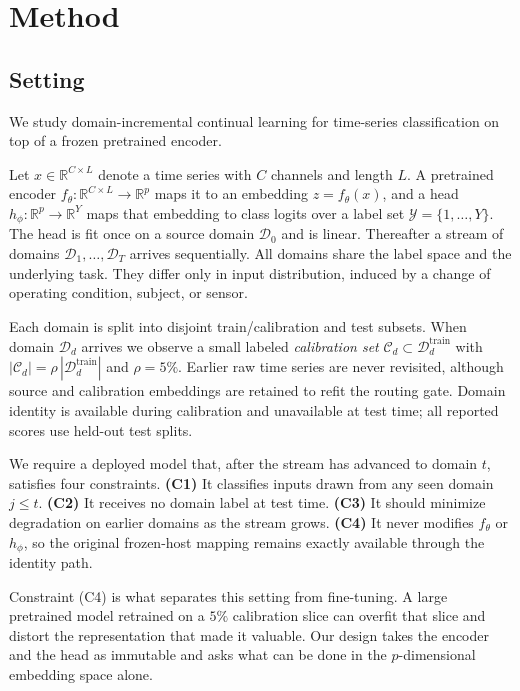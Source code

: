 \documentclass[letterpaper]{article} %
\begin{document}
\section{Method}
\label{sec:method}

\subsection{Setting}
\label{sec:setting}

We study domain-incremental continual learning for time-series classification
on top of a frozen pretrained encoder.

Let $x\in\mathbb{R}^{C\times L}$ denote a time series with $C$ channels and
length $L$. A pretrained encoder $f_\theta:\mathbb{R}^{C\times L}\to\mathbb{R}^{p}$
maps it to an embedding $z=f_\theta(x)$, and a head
$h_\phi:\mathbb{R}^{p}\to\mathbb{R}^{Y}$ maps that embedding to class logits over a
label set $\mathcal{Y}=\{1,\dots,Y\}$. The head is fit once on a source domain
$\mathcal{D}_0$ and is linear. Thereafter a stream of domains
$\mathcal{D}_1,\dots,\mathcal{D}_T$ arrives sequentially. All domains share the
label space and the underlying task. They differ only in input distribution,
induced by a change of operating condition, subject, or sensor.

Each domain is split into disjoint train/calibration and test subsets. When
domain $\mathcal{D}_d$ arrives we observe a small labeled \emph{calibration
set} $\mathcal{C}_d\subset\mathcal{D}^{\mathrm{train}}_d$ with
$|\mathcal{C}_d|=\rho\,|\mathcal{D}^{\mathrm{train}}_d|$ and $\rho=5\%$.
Earlier raw time series are never revisited, although source and calibration
embeddings are retained to refit the routing gate. Domain identity is available
during calibration and unavailable at test time; all reported scores use
held-out test splits.

We require a deployed model that, after the stream has advanced to domain $t$,
satisfies four constraints.
\textbf{(C1)} It classifies inputs drawn from any seen domain $j\le t$.
\textbf{(C2)} It receives no domain label at test time.
\textbf{(C3)} It should minimize degradation on earlier domains as the stream grows.
\textbf{(C4)} It never modifies $f_\theta$ or $h_\phi$, so the original
frozen-host mapping remains exactly available through the identity path.

Constraint (C4) is what separates this setting from fine-tuning. A large
pretrained model retrained on a $5\%$ calibration slice can overfit that slice
and distort the representation that made it valuable. Our design takes the
encoder and the head as immutable and asks what can be done in the
$p$-dimensional embedding space alone.
\end{document}
